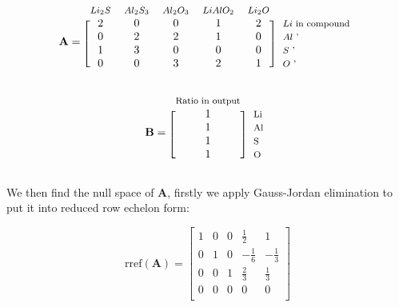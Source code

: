 \begin{minipage}{0.6\textwidth}
	\begin{equation*}
	\mathbf{A}=
	\begin{blockarray}{*{5}{c} l}
	\begin{block}{*{5}{>{$\footnotesize}c<{$}} l}
	$Li_2S$ & $Al_2S_3$ & $Al_2O_3$ & $LiAlO_2$ & $Li_2O$ \\
	\end{block}
	\begin{block}{[*{5}{c}]>{$\footnotesize}l<{$}}
	2 & 0 & 0 & 1 & 2 & $Li$ in compound\\
	0 & 2 & 2 & 1 & 0 & $Al$ ' \\
	1 & 3 & 0 & 0 & 0 & $S$ ' \\
	0 & 0 & 3 & 2 & 1 & $O$ ' \\
	\end{block}
	\end{blockarray}
	\end{equation*}	
\end{minipage}
\begin{minipage}{0.4\textwidth}
	\begin{equation*}
	\mathbf{B}=
	\begin{blockarray}{*{1}{c} l}
	\begin{block}{*{1}{>{$\footnotesize}c<{$}} l}
	Ratio in output \\
	\end{block}
	\begin{block}{[*{1}{c}]>{$\footnotesize}l<{$}}
	1 & Li \\
	1 & Al \\
	1 & S \\
	1 & O \\
	\end{block}
	\end{blockarray}
	\end{equation*}
\end{minipage}

\pagebreak

We then find the null space of $\mathbf{A}$, firstly we apply Gauss-Jordan elimination to put it into reduced row echelon form: 

\begin{equation*}
	\text{rref}(\mathbf{A})=
	\begin{bmatrix}
	1 & 0 & 0 & \frac{1}{2} & 1 \\
	0 & 1 & 0 & -\frac{1}{6} & -\frac{1}{3} \\
	0 & 0 & 1 & \frac{2}{3} & \frac{1}{3} \\
	0 & 0 & 0 & 0 & 0 \\
	\end{bmatrix}
\end{equation*}

